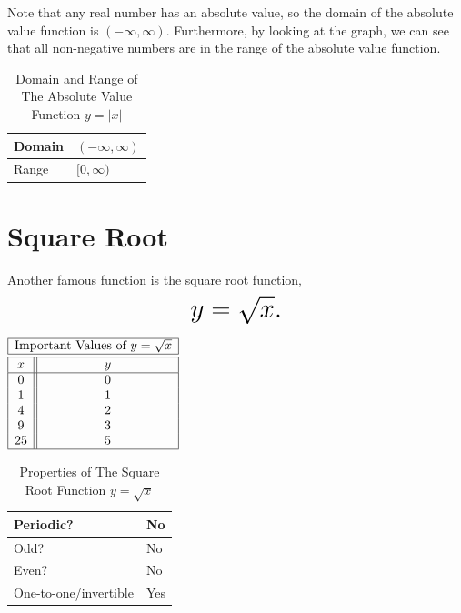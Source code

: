 \documentclass[nooutcomes]{ximera}
\begin{document}
Note that any real number has an absolute value, so the domain of the absolute value function is $(-\infty, \infty)$. Furthermore, by looking at the graph, we can see that all non-negative numbers are in the range of the absolute value function.


\begin{table}[h]
\caption{\label{tab:absdr}Domain and Range of The Absolute Value Function $y = |x|$}
\centering
\begin{tabular}{l|l}
Domain & $(-\infty, \infty)$ \\ \hline
Range & $[0, \infty)$
\end{tabular}
\end{table}

\newpage


\section{Square Root}
Another famous function is the square root function, $$ \mbox{\huge $y=\sqrt{x}.$}$$ 

\begin{image}
\end{image}


\begin{center}
\(
\begin{array}{ |c || c|  }
 \hline
 \multicolumn{2}{|c|}{\text{\normalfont Important Values of } y=\sqrt{x}} \\
\hline
 \hline
 x & y\\
 \hline
 0&0\\
 1&1\\
 4&2\\
 9&3\\
 25&5\\
 \hline
\end{array}
\)
\end{center}

\begin{table}[h]
\caption{\label{tab:sqrtproperties}Properties of The Square Root Function $y = \sqrt{x}$}
\centering
\begin{tabular}{l|l}
Periodic? & No\\ \hline
Odd? &  No \\ \hline
Even? & No \\ \hline
One-to-one/invertible & Yes
\end{tabular}
\end{table}
\end{document}
